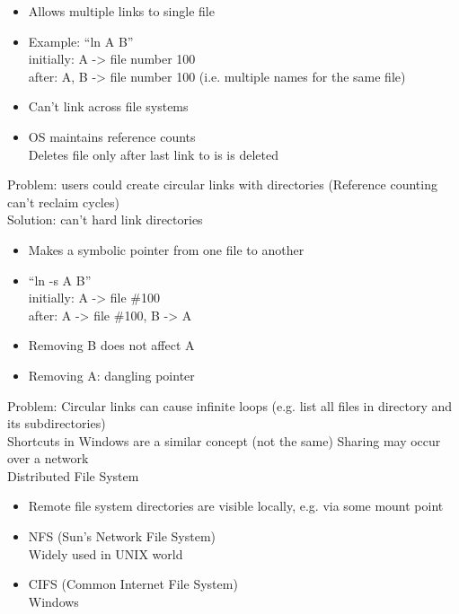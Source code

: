 \documentclass[number]{notes}
\begin{document}
\begin{landscape}
\begin{multicols}{3}
\begin{itemize}[nolistsep]
    \item Allows multiple links to single file
    \item Example: ``ln A B''\\
    initially: A -> file number 100\\
    after: A, B -> file number 100 (i.e. multiple names for the same file)
    \item Can't link across file systems
    \item OS maintains reference counts\\Deletes file only after last link to is is deleted
\end{itemize}
Problem: users could create circular links with directories (Reference counting can't reclaim cycles)\\
Solution: can't hard link directories
\begin{itemize}[nolistsep]
    \item Makes a symbolic pointer from one file to another
    \item ``ln -s A B''\\
    initially: A -> file \#100\\
    after: A -> file \#100, B -> A
    \item Removing B does not affect A
    \item Removing A: dangling pointer
\end{itemize}
Problem: Circular links can cause infinite loops (e.g. list all files in directory and its subdirectories)\\
Shortcuts in Windows are a similar concept (not the same)
Sharing may occur over a network\\
Distributed File System
\begin{itemize}[nolistsep]
    \item Remote file system directories are visible locally, e.g. via some mount point
    \item NFS (Sun's Network File System)\\
    Widely used in UNIX world
    \item CIFS (Common Internet File System)\\
    Windows
\end{itemize}


\end{multicols}
\end{landscape}
\end{document}
